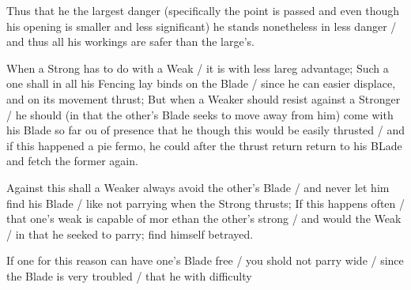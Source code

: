 Thus that he the largest danger (specifically the point is passed and
even though his opening is smaller and less significant) he stands
nonetheless in less danger / and thus all his workings are safer than
the large's.

When a Strong has to do with a Weak / it is with less lareg advantage;
Such a one shall in all his Fencing lay binds on the Blade / since he
can easier displace, and on its movement thrust; But when a Weaker
should resist against a Stronger / he should (in that the other's Blade
seeks to move away from him) come with his Blade so far ou of presence
that he though this would be easily thrusted / and if this happened a
pie fermo, he could after the thrust return return to his BLade and
fetch the former again.

Against this shall a Weaker always avoid the other's Blade / and never
let him find his Blade / like not parrying when the Strong thrusts; If
this happens often / that one's weak is capable of mor ethan the
other's strong / and would the Weak / in that he seeked to parry; find
himself betrayed.


If one for this reason can have one's Blade free / you shold not parry
wide / since the Blade is very troubled / that he with difficulty